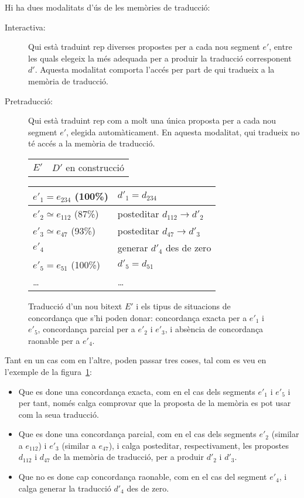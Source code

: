 Hi ha dues modalitats d'ús de les memòries de traducció:
\begin{description}
\item[Interactiva:] Qui està traduint rep diverses propostes per a
  cada nou segment $e'$, entre les quals elegeix la més adequada per a
  produir la traducció corresponent $d'$. Aquesta modalitat comporta
  l'accés per part de qui tradueix a la memòria de traducció.
\item[Pretraducció:] Qui està traduint rep com a molt una única
  proposta per a cada nou segment $e'$, elegida automàticament. En
  aquesta modalitat, qui tradueix no té accés a la memòria de
  traducció.
\end{description}
\begin{figure}
  \begin{center}
    \begin{tabular}{p{3cm}p{4cm}}
           $E'$ & $D'$ en construcció      
    \end{tabular}
    \begin{tabular}{|p{3cm}|p{4cm}|}
\hline
        $e'_1=e_{234}$ (100\%)& $d'_1=d_{234}$ \\\hline
        $e'_2\simeq e_{112}$ (87\%) & posteditar $d_{112} \to d'_2$ \\\hline
        $e'_3\simeq e_{47}$ (93\%) & posteditar $d_{47} \to d'_3$ \\\hline
        $e'_4$ & generar $d'_4$ des de zero \\\hline
        $e'_5=e_{51}$ (100\%) & $d'_5=d_{51}$ \\\hline
        \ldots & \ldots \\\hline
    \end{tabular}
  \end{center}
  \caption{Traducció d'un nou bitext $E'$ i els tipus de situacions de concordança que s'hi poden donar: concordança exacta per a $e'_1$ i $e'_5$, concordança parcial per a $e'_2$ i $e'_3$, i absència de concordança raonable per a $e'_4$.}
  \label{fg:pretrad}
\end{figure}
Tant en un cas com en l'altre, poden passar tres coses, tal com es veu
en l'exemple de la figura~\ref{fg:pretrad}:
\begin{itemize}
\item Que es done una concordança exacta, com en el cas dels segments
  $e'_1$ i $e'_5$ i per tant, només calga comprovar que la proposta de
  la memòria es pot usar com la seua traducció.
\item Que es done una concordança parcial, com en el cas dels segments
  $e'_2$ (similar a $e_{112}$) i $e'_3$ (similar a $e_{47}$), i calga
  posteditar, respectivament, les propostes $d_{112}$ i $d_{47}$ de la
  memòria de traducció, per a produir $d'_2$ i $d'_3$.
\item Que no es done cap concordança raonable, com en el cas del
  segment $e'_4$, i calga generar la traducció $d'_4$ des de zero.
\end{itemize}

